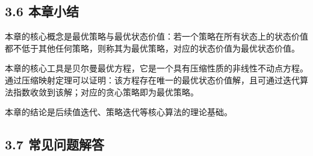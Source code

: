\documentclass[UTF8]{article}
\begin{document}
\subsection*{3.6 本章小结}

本章的核心概念是最优策略与最优状态价值：若一个策略在所有状态上的状态价值都不低于其他任何策略，则称其为最优策略，对应的状态价值为最优状态价值。

本章的核心工具是贝尔曼最优方程，它是一个具有压缩性质的非线性不动点方程。通过压缩映射定理可以证明：该方程存在唯一的最优状态价值解，且可通过迭代算法指数收敛到该解；对应的贪心策略即为最优策略。

本章的结论是后续值迭代、策略迭代等核心算法的理论基础。

\subsection*{3.7 常见问题解答}
\end{document}
